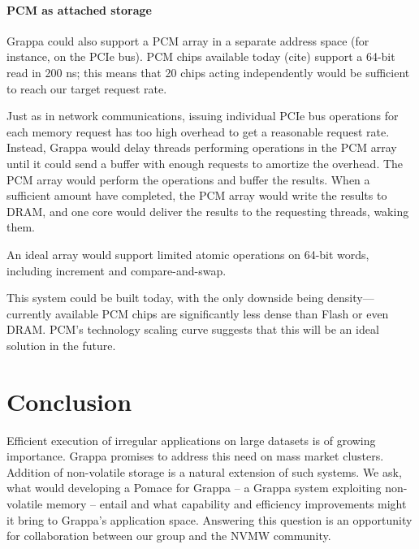 \paragraph{PCM as attached storage}

Grappa could also support a PCM array in a separate address space (for
instance, on the PCIe bus). PCM chips available today (cite) support a
64-bit read in 200 ns; this means that 20 chips acting independently
would be sufficient to reach our target request rate.

Just as in network communications, issuing individual PCIe bus
operations for each memory request has too high overhead to get a
reasonable request rate.  Instead, Grappa would delay threads
performing operations in the PCM array until it could send a buffer
with enough requests to amortize the overhead. The PCM array would
perform the operations and buffer the results. When a sufficient
amount have completed, the PCM array would write the results to DRAM,
and one core would deliver the results to the requesting threads,
waking them.

An ideal array would support limited atomic operations on 64-bit
words, including increment and compare-and-swap.

This system could be built today, with the only downside being
density---currently available PCM chips are significantly less dense
than Flash or even DRAM. PCM's technology scaling curve suggests that
this will be an ideal solution in the future.

\section{Conclusion}
Efficient execution of irregular applications on large datasets is of
growing importance.  Grappa promises to address this need on mass
market clusters.  Addition of non-volatile storage is a natural
extension of such systems.  We ask, what would developing a Pomace for
Grappa -- a Grappa system exploiting non-volatile memory -- entail and
what capability and efficiency improvements might it bring to Grappa’s
application space.  Answering this question is an opportunity for
collaboration between our group and the NVMW community.











